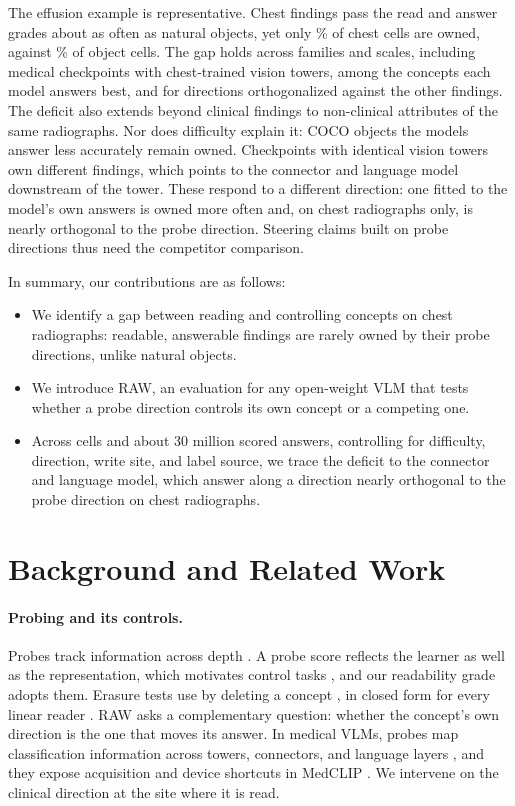 \documentclass[11pt]{article}
\begin{document}
The effusion example is representative. Chest findings pass the read and answer grades about as often as natural objects, yet only \cfChestOwnedPct\% of chest cells are owned, against \cfCocoOwnedPct\% of object cells. The gap holds across families and scales, including medical checkpoints with chest-trained vision towers, among the concepts each model answers best, and for directions orthogonalized against the other findings. The deficit also extends beyond clinical findings to non-clinical attributes of the same radiographs. Nor does difficulty explain it: COCO objects the models answer less accurately remain owned. Checkpoints with identical vision towers own different findings, which points to the connector and language model downstream of the tower. These respond to a different direction: one fitted to the model's own answers is owned more often and, on chest radiographs only, is nearly orthogonal to the probe direction. Steering claims built on probe directions thus need the competitor comparison.

In summary, our contributions are as follows:
\begin{itemize}[leftmargin=*,nosep]
\item We identify a gap between reading and controlling concepts on chest radiographs: readable, answerable findings are rarely owned by their probe directions, unlike natural objects.
\item We introduce RAW, an evaluation for any open-weight VLM that tests whether a probe direction controls its own concept or a competing one.
\item Across \cfCells{} cells and about 30 million scored answers, controlling for difficulty, direction, write site, and label source, we trace the deficit to the connector and language model, which answer along a direction nearly orthogonal to the probe direction on chest radiographs.
\end{itemize}

\section{Background and Related Work}
\label{sec:related}

\paragraph{Probing and its controls.}
Probes track information across depth \citep{alain2017understanding}. A probe score reflects the learner as well as the representation, which motivates control tasks \citep{hewitt2019designing}, and our readability grade adopts them. Erasure tests use by deleting a concept \citep{ravfogel2020null,elazar2021amnesic}, in closed form for every linear reader \citep{belrose2023leace}. RAW asks a complementary question: whether the concept's own direction is the one that moves its answer. In medical VLMs, probes map classification information across towers, connectors, and language layers \citep{zhu2026lost}, and they expose acquisition and device shortcuts in MedCLIP \citep{wang2022medclip,pedersen2026probes}. We intervene on the clinical direction at the site where it is read.
\end{document}
